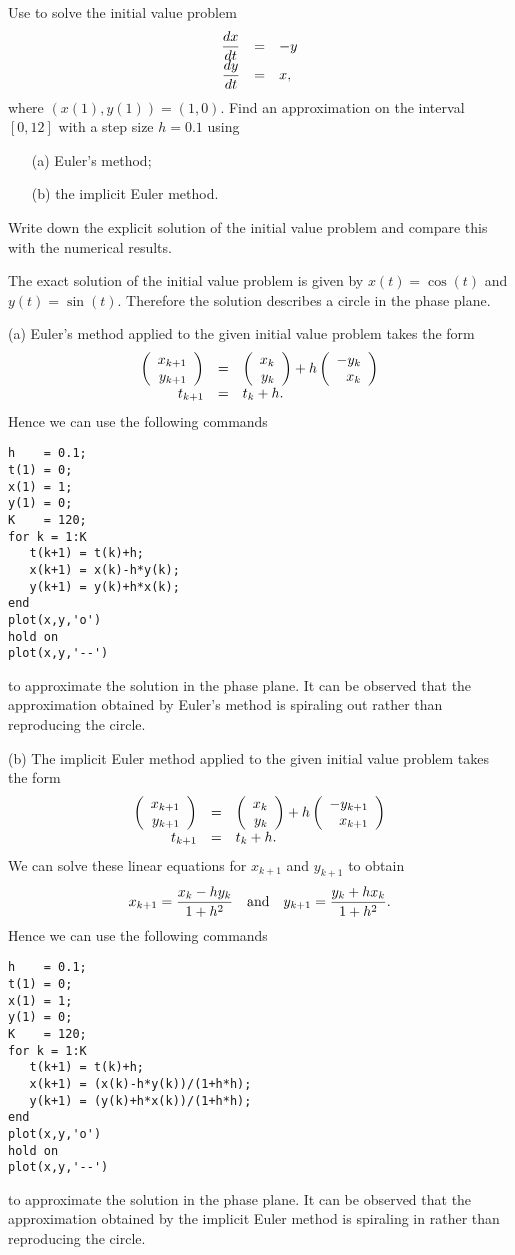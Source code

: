 \documentclass{ximera}
\begin{document}
\begin{exercise} \label{c15.1.9}
Use \Matlab to solve the initial value problem
\arraystart
\[
\begin{array}{rcl}
\displaystyle \frac{dx}{dt} & = & -y\\
\displaystyle \frac{dy}{dt} & = & x,
\end{array}
\]
\arrayfinish
where $(x(1),y(1))= (1,0)$.  Find an approximation 
on the interval $[0,12]$ with a step size $h=0.1$ using 
\begin{itemize}
\item[(a)] Euler's method;
\item[(b)] the implicit Euler method.
\end{itemize}
Write down the explicit solution of the initial
value problem and compare this with the numerical
results.  

\begin{solution}
The exact solution of the initial value problem
is given by $x(t) = \cos(t)$ and $y(t)=\sin(t)$.  Therefore the
solution describes a circle in the phase plane.

(a) Euler's method applied to the given initial value problem
takes the form
\[
\begin{array}{rcl}
\left(\begin{array}{r} x_{k+1} \\ y_{k+1}\end{array}\right) & = &
\left(\begin{array}{r} x_k \\ y_k\end{array}\right) + h \left(\begin{array}{r} -y_k \\ x_k\end{array}\right)\\
t_{k+1} & = & t_k + h.
\end{array}
\]
Hence we can use the following \Matlab commands
\begin{verbatim}
h    = 0.1;
t(1) = 0;
x(1) = 1;
y(1) = 0;
K    = 120;
for k = 1:K
   t(k+1) = t(k)+h;
   x(k+1) = x(k)-h*y(k);
   y(k+1) = y(k)+h*x(k);
end
plot(x,y,'o')
hold on
plot(x,y,'--')
\end{verbatim}
to approximate the solution in the phase plane.  It can be observed
that the approximation obtained by Euler's method is spiraling out
rather than reproducing the circle.

(b)  The implicit Euler method applied to the given initial value
problem takes the form
\[
\begin{array}{rcl}
\left(\begin{array}{r} x_{k+1} \\ y_{k+1}\end{array}\right) & = &
\left(\begin{array}{r} x_k \\ y_k\end{array}\right) + h \left(\begin{array}{r} -y_{k+1} \\ x_{k+1}\end{array}\right)\\
t_{k+1} & = & t_k + h.
\end{array}
\]
We can solve these linear equations for $x_{k+1}$ and $y_{k+1}$ to obtain
\[
x_{k+1} = \frac{x_k-hy_k}{1+h^2} \quad\mbox{and}\quad
y_{k+1} = \frac{y_k+hx_k}{1+h^2}.
\]
Hence we can use the following \Matlab commands
\begin{verbatim}
h    = 0.1;
t(1) = 0;
x(1) = 1;
y(1) = 0;
K    = 120;
for k = 1:K
   t(k+1) = t(k)+h;
   x(k+1) = (x(k)-h*y(k))/(1+h*h);
   y(k+1) = (y(k)+h*x(k))/(1+h*h);
end
plot(x,y,'o')
hold on
plot(x,y,'--')
\end{verbatim}
to approximate the solution in the phase plane.  It can be observed
that the approximation obtained by the implicit Euler method is
spiraling in rather than reproducing the circle.





\end{solution}
\end{exercise}
\end{document}
